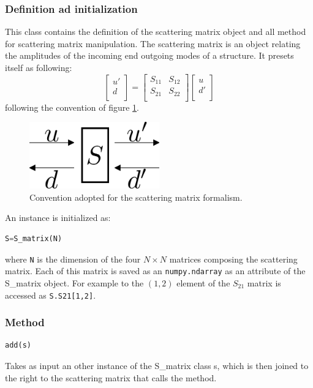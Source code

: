 \documentclass[a4paper,10pt]{report}
\begin{document}
\subsubsection{Definition ad initialization}
This class contains the definition of the scattering matrix object and all method for scattering matrix manipulation. The scattering matrix is an object relating the amplitudes of the incoming end outgoing modes of a structure. It presets itself as following:
\begin{equation} \label{eq:S_matrix_def}
\left[
\begin{array}{c}
u' \\
d  \\
\end{array} 
 \right] = \left[
 \begin{array}{cc}
S_{11} & S_{12} \\
S_{21} & S_{22} \\
\end{array}
 \right]
 \left[
\begin{array}{c}
u \\
d' \\
\end{array} 
\right]
\end{equation}
following the convention of figure \ref{fig:SM_conv}.
\begin{figure}
\centering
\includegraphics[width=0.5\textwidth]{figures/S.png}
\caption{Convention adopted for the scattering matrix formalism.} \label{fig:SM_conv}
\end{figure}
An instance is initialized as:
\begin{lstlisting}[language=Python]
S=S_matrix(N)
\end{lstlisting}
where \texttt{N} is the dimension of the four $N \times N$ matrices composing the scattering matrix. Each of this matrix is saved as an \texttt{numpy.ndarray} as an attribute of the S\_matrix object. For example to the $(1,2)$ element of the $S_{21}$ matrix is accessed as \texttt{S.S21[1,2]}.

\subsubsection{Method}
\begin{lstlisting}[language=Python,basicstyle=\ttfamily\Large]
add(s)
\end{lstlisting}
Takes as input an other instance of the S\_matrix class s, which is then joined to the right to the scattering matrix that calls the method.
\end{document}
